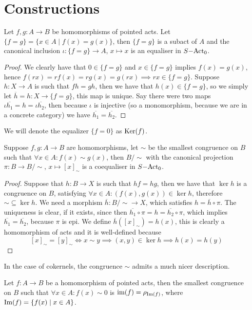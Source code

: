 \section{Constructions}
\begin{proposition}
    Let $f,g: A \to B$ be homomorphisms of pointed acts. Let $\{f=g\} = \{x\in A \mid f(x) = g(x)\}$, then $\{f=g\}$ is a subact of $A$ and 
    the canonical inclusion $\iota: \{f=g\} \to A$, $x\mapsto x$ is an equaliser in $S\mathrm{-Act}_0$.
\end{proposition}
\begin{proof}
    We clearly have that $0\in\{f=g\}$ and $x\in\{f=g\}$ implies $f(x)=g(x)$, hence $f(rx)=rf(x)=rg(x)=g(rx) \implies rx\in\{f=g\}$. 
    Suppose $h: X \to A$ is such that $fh=gh$, then we have that $h(x)\in\{f=g\}$, so we simply let $\overline{h} = h: X\to\{f=g\}$, this
    map is unique. Say there were two maps $\iota\overline{h_1}=h=\iota\overline{h_2}$, then because $\iota$ is injective (so a monomorphism, 
    because we are in a concrete category) we have $\overline{h_1}=\overline{h_2}$.
\end{proof}
    We will denote the equalizer $\{f=0\}$ as $\mathrm{Ker}(f)$. 
\begin{proposition}
    Suppose $f,g: A\to B$ are homomorphisms, let $\sim$ be the smallest congruence on $B$ such that $\forall x\in A: f(x)\sim g(x)$, then 
    $B/\sim$ with the canonical projection $\pi: B\to B/\sim$, $x\mapsto [x]_\sim$ is a coequaliser in $S\mathrm{-Act}_0$. 
\end{proposition}
\begin{proof}
    Suppose that $h: B\to X$ is such that $hf=hg$, then we have that $\ker{h}$ is a congruence on $B$, satisfying 
    $\forall x\in A: (f(x),g(x))\in\ker{h}$, therefore $\sim\subseteq\ker{h}$. We need a morphism $\overline{h}: B/\sim \to X$, which satisfies 
    $h = \overline{h} \circ\pi$. The uniqueness is clear, if it exists, since then $\overline{h_1}\circ\pi = h = \overline{h_2}\circ\pi$, 
    which implies $\overline{h_1}=\overline{h_2}$, because $\pi$ is epi. We define $\overline{h}([x]_\sim) = h(x)$, this 
    is clearly a homomorphism of acts and it is well-defined because
    \[
        [x]_\sim = [y]_\sim\iff x\sim y \implies (x,y)\in\ker{h} \implies h(x)=h(y)
    \] 
\end{proof}
    In the case of cokernels, the congruence $\sim$ admits a much nicer description. 
\begin{proposition}
    Let $f: A \to B$ be a homomorphism of pointed acts, then the smallest congruence on $B$ such that $\forall x\in A :f(x)\sim 0$ is
    $\text{im}(f)=\rho_{\mathrm{Im}(f)}$, where $\mathrm{Im}(f) = \{f(x) \mid x\in A\}$.
\end{proposition}
